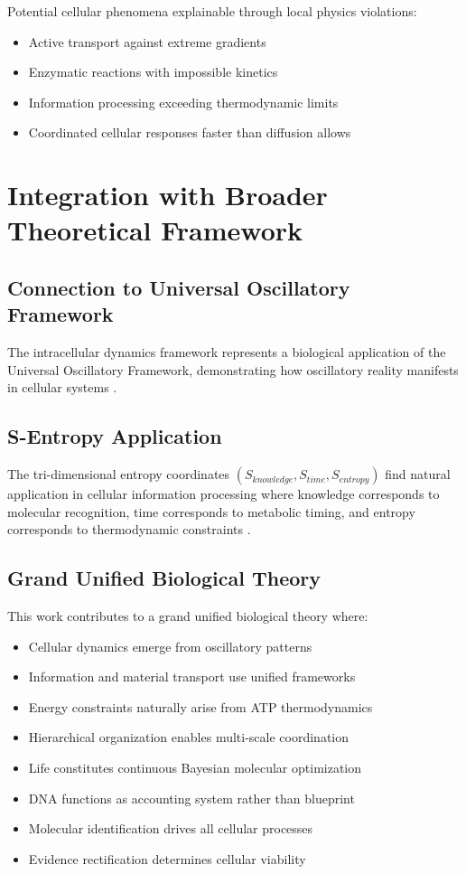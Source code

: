 \documentclass[12pt,a4paper]{article}
\begin{document}
Potential cellular phenomena explainable through local physics violations:
\begin{itemize}
\item Active transport against extreme gradients
\item Enzymatic reactions with impossible kinetics
\item Information processing exceeding thermodynamic limits
\item Coordinated cellular responses faster than diffusion allows
\end{itemize}

\section{Integration with Broader Theoretical Framework}

\subsection{Connection to Universal Oscillatory Framework}

The intracellular dynamics framework represents a biological application of the Universal Oscillatory Framework, demonstrating how oscillatory reality manifests in cellular systems \cite{sachikonye2024oscillatory}.

\subsection{S-Entropy Application}

The tri-dimensional entropy coordinates $(S_{knowledge}, S_{time}, S_{entropy})$ find natural application in cellular information processing where knowledge corresponds to molecular recognition, time corresponds to metabolic timing, and entropy corresponds to thermodynamic constraints \cite{sachikonye2024sentropy}.

\subsection{Grand Unified Biological Theory}

This work contributes to a grand unified biological theory where:
\begin{itemize}
\item Cellular dynamics emerge from oscillatory patterns
\item Information and material transport use unified frameworks
\item Energy constraints naturally arise from ATP thermodynamics
\item Hierarchical organization enables multi-scale coordination
\item Life constitutes continuous Bayesian molecular optimization
\item DNA functions as accounting system rather than blueprint
\item Molecular identification drives all cellular processes
\item Evidence rectification determines cellular viability
\end{itemize}
\end{document}
